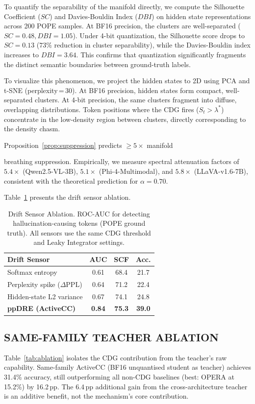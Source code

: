 \documentclass{ieeetmlcn}
\begin{document}
To quantify the separability of the manifold directly, we compute the Silhouette Coefficient ($SC$) and Davies-Bouldin Index ($DBI$) on hidden state representations across 200 POPE samples. At BF16 precision, the clusters are well-separated ($SC = 0.48, DBI = 1.05$). Under 4-bit quantization, the Silhouette score drops to $SC = 0.13$ ($73\%$ reduction in cluster separability), while the Davies-Bouldin index increases to $DBI = 3.64$. This confirms that quantization significantly fragments the distinct semantic boundaries between ground-truth labels. 

To visualize this phenomenon, we project the hidden states to 2D using PCA and t-SNE (perplexity\,=\,30). At BF16 precision, hidden states form compact, well-separated clusters. At 4-bit precision, the same clusters fragment into diffuse, overlapping distributions. Token positions where the CDG fires ($S_t > \lambda^*$) concentrate in the low-density region between clusters, directly corresponding to the density chasm.


Proposition~\ref{prop:suppression} predicts $\geq 5\times$ manifold

breathing suppression. Empirically, we measure spectral attenuation
factors of $5.4\times$ (Qwen2.5-VL-3B), $5.1\times$
(Phi-4-Multimodal), and $5.8\times$ (LLaVA-v1.6-7B), consistent with
the theoretical prediction for $\alpha=0.70$.

Table~\ref{tab:sensor} presents the drift sensor ablation.

\begin{table}[htbp]
\caption{Drift Sensor Ablation. ROC-AUC for detecting hallucination-causing tokens (POPE ground truth). All sensors use the same CDG threshold and Leaky Integrator settings.}
\label{tab:sensor}
\centering
\begin{tabular}{p{3.8cm}ccc}
\toprule
\textbf{Drift Sensor} & \textbf{AUC} & \textbf{SCF} & \textbf{Acc.} \\
\midrule
Softmax entropy          & 0.61 & 68.4 & 21.7 \\
Perplexity spike ($\Delta$PPL)  & 0.64 & 71.2 & 22.4 \\
Hidden-state L2 variance & 0.67 & 74.1 & 24.8 \\
\textbf{ppDRE (ActiveCC)} & \textbf{0.84} & \textbf{75.3} & \textbf{39.0} \\
\bottomrule
\end{tabular}
\end{table}

\subsection{SAME-FAMILY TEACHER ABLATION}
\label{sec:ablation}
Table~\ref{tab:ablation} isolates the CDG contribution from the
teacher's raw capability. Same-family ActiveCC (BF16 unquantised student
as teacher) achieves 31.4\% accuracy, still outperforming all non-CDG
baselines (best: OPERA at 15.2\%) by 16.2\,pp. The 6.4\,pp additional
gain from the cross-architecture teacher is an additive benefit, not the
mechanism's core contribution.
\end{document}
